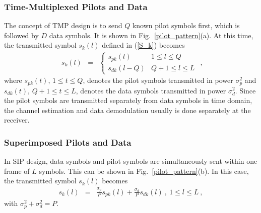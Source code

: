 \documentclass[10pt,fleqn, twocolumn]{IEEEtran}
\begin{document}
\subsubsection{Time-Multiplexed Pilots and Data}
The concept of TMP design is to send $Q$ known pilot symbols
first, which is followed by $D$ data symbols. It is shown in
Fig.~\ref{pilot_pattern}(a). At this time, the transmitted symbol
$s_{k}(l)$ defined in (\ref{S_k}) becomes
\begin{equation}
\begin{array}{rcl}
s_{k}\left(l\right)&=&
\begin{cases}
s_{pk}(l) & 1 \leq l \leq Q \\
s_{dk}(l-Q) & Q+1\leq l\leq L
\end{cases}
\end{array},\label{TMP_k}
\end{equation}
\noindent where $s_{pk}(t)$, $1\leq t \leq Q$, denotes the pilot
symbols transmitted in power $\sigma_{p}^2$ and $s_{dk}(t)$,
$Q+1\leq t \leq L$, denotes the data symbols transmitted in power
$\sigma_{d}^2$. Since the pilot symbols are transmitted separately
from data symbols in time domain, the channel estimation and data
demodulation usually is done separately at the receiver.
\subsubsection{Superimposed Pilots and Data}
In SIP design, data symbols and pilot symbols are simultaneously
sent within one frame of $L$ symbols. This can be shown in
Fig.~\ref{pilot_pattern}(b). In this case, the transmitted symbol
$s_{k}(l)$ becomes
\begin{equation}
\begin{array}{rcl}
s_{k}\left(l\right)&=&\frac{\sigma_{p}}{P}s_{pk}\left(l\right)+\frac{\sigma_{d}}{P}s_{dk}\left(l\right)\
,\ 1\leq l\leq L\ ,
\end{array}\label{SIP_k}
\end{equation}
\noindent with $\sigma_{p}^2+\sigma_{d}^2=P$.
\end{document}
